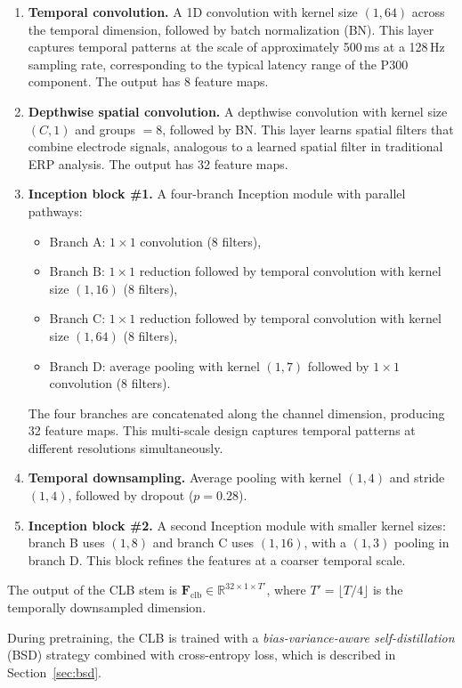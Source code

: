 \begin{enumerate}
    \item \textbf{Temporal convolution.} A 1D convolution with kernel size $(1, 64)$ across the temporal dimension, followed by batch normalization (BN). This layer captures temporal patterns at the scale of approximately 500\,ms at a 128\,Hz sampling rate, corresponding to the typical latency range of the P300 component. The output has 8 feature maps.
    \item \textbf{Depthwise spatial convolution.} A depthwise convolution with kernel size $(C, 1)$ and groups $= 8$, followed by BN. This layer learns spatial filters that combine electrode signals, analogous to a learned spatial filter in traditional ERP analysis. The output has 32 feature maps.
    \item \textbf{Inception block \#1.} A four-branch Inception module with parallel pathways:
    \begin{itemize}
        \item Branch A: $1 \times 1$ convolution (8 filters),
        \item Branch B: $1 \times 1$ reduction followed by temporal convolution with kernel size $(1, 16)$ (8 filters),
        \item Branch C: $1 \times 1$ reduction followed by temporal convolution with kernel size $(1, 64)$ (8 filters),
        \item Branch D: average pooling with kernel $(1, 7)$ followed by $1 \times 1$ convolution (8 filters).
    \end{itemize}
    The four branches are concatenated along the channel dimension, producing 32 feature maps. This multi-scale design captures temporal patterns at different resolutions simultaneously.
    \item \textbf{Temporal downsampling.} Average pooling with kernel $(1, 4)$ and stride $(1, 4)$, followed by dropout ($p = 0.28$).
    \item \textbf{Inception block \#2.} A second Inception module with smaller kernel sizes: branch B uses $(1, 8)$ and branch C uses $(1, 16)$, with a $(1, 3)$ pooling in branch D. This block refines the features at a coarser temporal scale.
\end{enumerate}

The output of the CLB stem is $\mathbf{F}_{\text{clb}} \in \mathbb{R}^{32 \times 1 \times T'}$, where $T' = \lfloor T / 4 \rfloor$ is the temporally downsampled dimension.

During pretraining, the CLB is trained with a \emph{bias-variance-aware self-distillation} (BSD) strategy combined with cross-entropy loss, which is described in Section~\ref{sec:bsd}.


